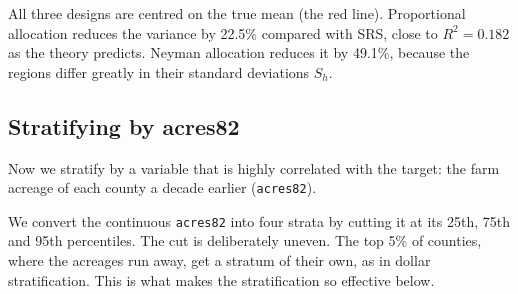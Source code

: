 \documentclass[
  letterpaper,
  DIV=11,
  numbers=noendperiod]{scrreprt}
\newenvironment{Shaded}{\begin{snugshade}}{\end{snugshade}}
\newcommand{\AttributeTok}[1]{\textcolor[rgb]{0.40,0.45,0.13}{#1}}
\newcommand{\DecValTok}[1]{\textcolor[rgb]{0.68,0.00,0.00}{#1}}
\newcommand{\DocumentationTok}[1]{\textcolor[rgb]{0.37,0.37,0.37}{\textit{#1}}}
\newcommand{\FloatTok}[1]{\textcolor[rgb]{0.68,0.00,0.00}{#1}}
\newcommand{\FunctionTok}[1]{\textcolor[rgb]{0.28,0.35,0.67}{#1}}
\newcommand{\NormalTok}[1]{\textcolor[rgb]{0.00,0.23,0.31}{#1}}
\newcommand{\OtherTok}[1]{\textcolor[rgb]{0.00,0.23,0.31}{#1}}
\newcommand{\SpecialCharTok}[1]{\textcolor[rgb]{0.37,0.37,0.37}{#1}}
\newcommand{\StringTok}[1]{\textcolor[rgb]{0.13,0.47,0.30}{#1}}
\renewcommand{\[}{\begin{equation}}
\renewcommand{\]}{\end{equation}}
\begin{document}
All three designs are centred on the true mean (the red line).
Proportional allocation reduces the variance by 22.5\% compared with
SRS, close to \(R^2 = 0.182\) as the theory predicts. Neyman allocation
reduces it by 49.1\%, because the regions differ greatly in their
standard deviations \(S_h\).

\subsection{Stratifying by acres82}\label{stratifying-by-acres82}

Now we stratify by a variable that is highly correlated with the target:
the farm acreage of each county a decade earlier (\texttt{acres82}).

\begin{Shaded}
\end{Shaded}

We convert the continuous \texttt{acres82} into four strata by cutting
it at its 25th, 75th and 95th percentiles. The cut is deliberately
uneven. The top 5\% of counties, where the acreages run away, get a
stratum of their own, as in dollar stratification. This is what makes
the stratification so effective below.

\begin{Shaded}
\end{Shaded}
\end{document}
